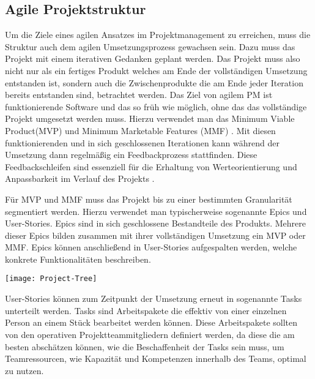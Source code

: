 \subsection{Agile Projektstruktur}
Um die Ziele eines agilen Ansatzes im Projektmanagement zu erreichen, muss die Struktur auch dem agilen Umsetzungsprozess gewachsen sein. Dazu muss das Projekt mit einem iterativen Gedanken geplant werden. Das Projekt muss also nicht nur als ein fertiges Produkt welches am Ende der vollständigen Umsetzung entstanden ist, sondern auch die Zwischenprodukte die am Ende jeder Iteration bereits entstanden sind, betrachtet werden. Das Ziel von agilem PM ist funktionierende Software und das so früh wie möglich, ohne das das vollständige Projekt umgesetzt werden muss. Hierzu verwendet man das Minimum Viable Product(MVP) und Minimum Marketable Features (MMF) \cite{}.  Mit diesen funktionierenden und in sich geschlossenen Iterationen kann während der Umsetzung dann regelmäßig ein Feedbackprozess stattfinden. Diese Feedbackschleifen sind essenziell für die Erhaltung von Werteorientierung und Anpassbarkeit im Verlauf des Projekts \cite{}.

Für MVP und MMF muss das Projekt bis zu einer bestimmten Granularität segmentiert werden. Hierzu verwendet man typischerweise sogenannte Epics und User-Stories. Epics sind in sich geschlossene Bestandteile des Produkts. Mehrere dieser Epics bilden zusammen mit ihrer vollständigen Umsetzung ein MVP oder MMF. Epics können anschließend in User-Stories aufgespalten werden, welche konkrete Funktionalitäten beschreiben. \cite{}

\vspace{20pt}
\begin{center}
    \begin{minipage}{0.8\linewidth}
        \texttt{[image: Project-Tree]}
    \end{minipage}
\end{center}
\vspace{20pt}

User-Stories können zum Zeitpunkt der Umsetzung erneut in sogenannte Tasks unterteilt werden. Tasks sind Arbeitspakete die effektiv von einer einzelnen Person an einem Stück bearbeitet werden können. Diese Arbeitspakete sollten von den operativen Projektteammitgliedern definiert werden, da diese die am besten abschätzen können, wie die Beschaffenheit der Tasks sein muss, um Teamressourcen, wie Kapazität und Kompetenzen innerhalb des Teams, optimal zu nutzen. \cite{}


